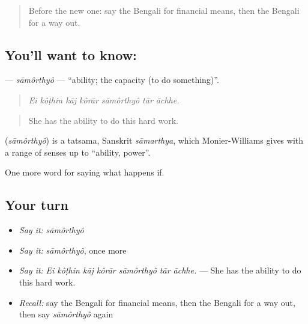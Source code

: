 \label{lesson:BN-C528-samorthyo}



\begin{quote}
Before the new one: say the Bengali for financial means, then the Bengali for a way out.
\end{quote}

\subsection*{You'll want to know: }
\textbf{} — \emph{sāmôrthyô} — \textquotedblleft{}ability; the capacity (to do something)\textquotedblright{}.

\begin{quote}
      
\end{quote}

\begin{quote}
\emph{Ei kôṭhin kāj kôrār sāmôrthyô tār āchhe.}
\end{quote}

\begin{quote}
She has the ability to do this hard work.
\end{quote}

\begin{cousinweb}
\textbf{} (\emph{sāmôrthyô}) is a tatsama, Sanskrit \emph{sāmarthya}, which Monier-Williams gives with a range of senses up to \textquotedblleft{}ability, power\textquotedblright{}.
\end{cousinweb}

\begin{grammarlens}[title={What you've built}]
One more word for saying what happens if.
\end{grammarlens}

\subsection*{Your turn}
\begin{itemize}
\raggedright
  \item \emph{Say it:} \emph{sāmôrthyô}
  \item \emph{Say it:} \emph{sāmôrthyô}, once more
  \item \emph{Say it:} \emph{Ei kôṭhin kāj kôrār sāmôrthyô tār āchhe.} — She has the ability to do this hard work.
  \item \emph{Recall:} say the Bengali for financial means, then the Bengali for a way out, then say \emph{sāmôrthyô} again
\end{itemize}

